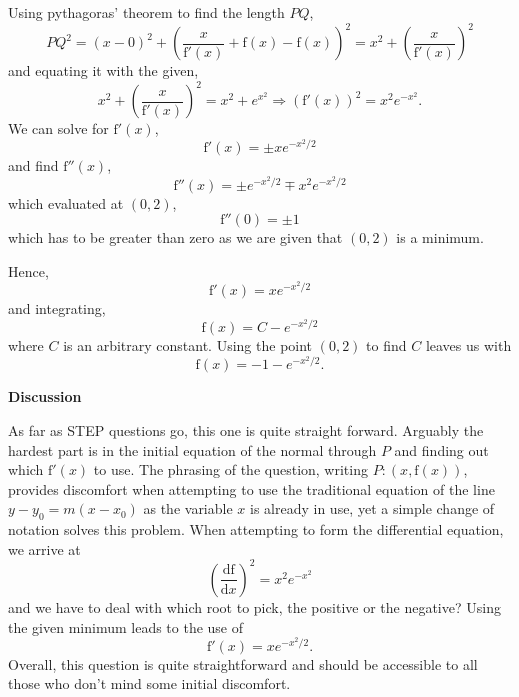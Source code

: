 \documentclass{article}
\begin{document}
\vspace{0.5cm}

Using pythagoras' theorem to find the length $PQ$,
\[
PQ^2 = (x-0)^2 + \left(\frac{x}{\mathrm{f}'(x)}+\mathrm{f}(x) - \mathrm{f}(x)\right)^2 = x^2 + \left(\frac{x}{\mathrm{f}'(x)}\right)^2
\]
and equating it with the given,
\[
x^2 + \left(\frac{x}{\mathrm{f}'(x)}\right)^2 = x^2 + e^{x^2} \Rightarrow (\mathrm{f}'(x))^2 =  x^2e^{-x^2}.
\]
We can solve for $\mathrm{f}'(x)$,
\[
\mathrm{f}'(x)=  \pm xe^{-x^2/2}
\]
and find $\mathrm{f}''(x)$,
\[
\mathrm{f}''(x)=  \pm e^{-x^2/2} \mp x^2e^{-x^2/2}
\]
which evaluated at $(0,2)$,
\[
\mathrm{f}''(0)=  \pm 1
\]
which has to be greater than zero as we are given that $(0,2)$ is a minimum.\par 
\quad Hence,
\[
\mathrm{f}'(x)=   xe^{-x^2/2}
\]
and integrating,
\[
\mathrm{f}(x) = C-e^{-x^2/2}
\]
where $C$ is an arbitrary constant. Using the point $(0,2)$ to find $C$ leaves us with 
\[
\mathrm{f}(x) = -1-e^{-x^2/2}.
\]
\newpage

\begin{center}
    \textbf{Discussion}
\end{center}

\vspace{0.5cm}

As far as STEP questions go, this one is quite straight forward. Arguably the hardest part is in the initial equation of the normal through $P$ and finding out which $\mathrm{f}'(x)$ to use. The phrasing of the question, writing $P:(x,\mathrm{f}(x))$, provides discomfort when attempting to use the traditional equation of the line $y-y_0=m(x-x_0)$ as the variable $x$ is already in use, yet a simple change of notation solves this problem. When attempting to form the differential equation, we arrive at 
\[
\left(\frac{\mathrm{df}}{\mathrm{d}x}\right)^2 = x^2e^{-x^2}
\]
and we have to deal with which root to pick, the positive or the negative? Using the given minimum leads to the use of 
\[
\mathrm{f}'(x) = xe^{-x^2/2}.
\]
Overall, this question is quite straightforward and should be accessible to all those who don't mind some initial discomfort. 
\end{document}
